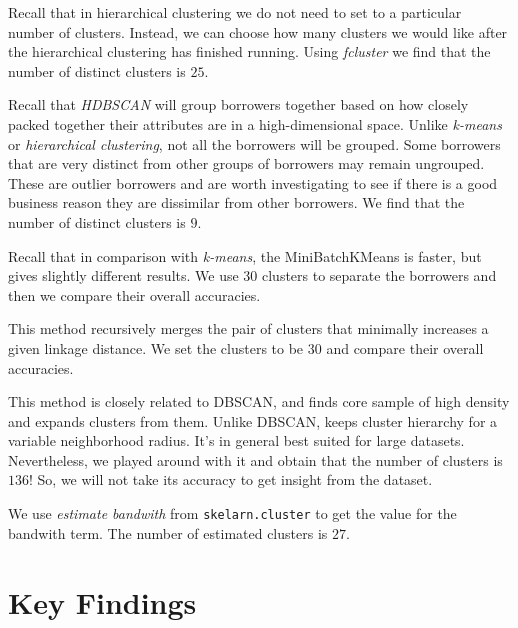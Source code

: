 \documentclass[a4paper,11pt]{amsart}
\begin{document}
\medbreak

 Recall that in hierarchical clustering we do not need to set to a particular number of clusters. Instead, we can choose how many clusters we would like after the hierarchical clustering has finished running. Using \emph{fcluster} we find that the number of distinct clusters is $25$.

\medbreak

 Recall that \emph{HDBSCAN} will group borrowers together based on how closely packed together their attributes are in a high-dimensional space. Unlike \emph{k-means} or \emph{hierarchical clustering}, not all the borrowers will be grouped. Some borrowers that are very distinct from other groups of borrowers may remain ungrouped. These are outlier borrowers and are worth investigating to see if there is a good business reason they are dissimilar from other borrowers. We find that the number of distinct clusters is $9$.

\medbreak

 Recall that in comparison with \emph{k-means}, the MiniBatchKMeans is faster, but gives slightly different results. We use 30 clusters to separate the borrowers and then we compare their overall accuracies.

\medbreak

 This method recursively merges the pair of clusters that minimally increases a given linkage distance. We set the clusters to be $30$ and compare their overall accuracies.

\medbreak

 This method is closely related to DBSCAN, and finds core sample of high density and expands clusters from them. Unlike DBSCAN, keeps cluster hierarchy for a variable neighborhood radius. It's in general best suited for large datasets. Nevertheless, we played around with it and obtain that the number of clusters is $136$! So, we will not take its accuracy to get insight from the dataset.

\medbreak

 We use \emph{estimate bandwith} from \texttt{skelarn.cluster} to get the value for the bandwith term. The number of estimated clusters is $27$.

\section{Key Findings}\label{results}
\end{document}
